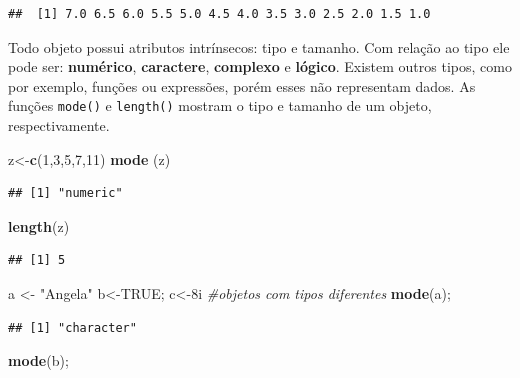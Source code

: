 \documentclass[
]{book}
\newenvironment{Shaded}{\begin{snugshade}}{\end{snugshade}}
\newcommand{\CommentTok}[1]{\textcolor[rgb]{0.56,0.35,0.01}{\textit{#1}}}
\newcommand{\DecValTok}[1]{\textcolor[rgb]{0.00,0.00,0.81}{#1}}
\newcommand{\KeywordTok}[1]{\textcolor[rgb]{0.13,0.29,0.53}{\textbf{#1}}}
\newcommand{\NormalTok}[1]{#1}
\newcommand{\OtherTok}[1]{\textcolor[rgb]{0.56,0.35,0.01}{#1}}
\newcommand{\StringTok}[1]{\textcolor[rgb]{0.31,0.60,0.02}{#1}}
\begin{document}
\begin{verbatim}
##  [1] 7.0 6.5 6.0 5.5 5.0 4.5 4.0 3.5 3.0 2.5 2.0 1.5 1.0
\end{verbatim}

Todo objeto possui atributos intrínsecos: tipo e tamanho. Com relação ao tipo ele pode ser: \textbf{numérico}, \textbf{caractere}, \textbf{complexo} e \textbf{lógico}. Existem outros tipos, como por exemplo, funções ou expressões, porém esses não representam dados.
As funções \texttt{mode()} e \texttt{length()} mostram o tipo e tamanho de um objeto, respectivamente.

\begin{Shaded}
\begin{Highlighting}[]
\NormalTok{z<-}\KeywordTok{c}\NormalTok{(}\DecValTok{1}\NormalTok{,}\DecValTok{3}\NormalTok{,}\DecValTok{5}\NormalTok{,}\DecValTok{7}\NormalTok{,}\DecValTok{11}\NormalTok{) }
\KeywordTok{mode}\NormalTok{ (z)}
\end{Highlighting}
\end{Shaded}

\begin{verbatim}
## [1] "numeric"
\end{verbatim}

\begin{Shaded}
\begin{Highlighting}[]
\KeywordTok{length}\NormalTok{(z)}
\end{Highlighting}
\end{Shaded}

\begin{verbatim}
## [1] 5
\end{verbatim}

\begin{Shaded}
\begin{Highlighting}[]
\NormalTok{a <-}\StringTok{ "Angela"}
\NormalTok{b<-}\OtherTok{TRUE}\NormalTok{; }
\NormalTok{c<-8i }\CommentTok{#objetos com tipos diferentes}
\KeywordTok{mode}\NormalTok{(a); }
\end{Highlighting}
\end{Shaded}

\begin{verbatim}
## [1] "character"
\end{verbatim}

\begin{Shaded}
\begin{Highlighting}[]
\KeywordTok{mode}\NormalTok{(b); }
\end{Highlighting}
\end{Shaded}
\end{document}
